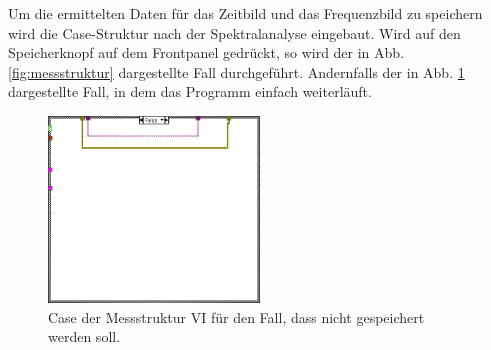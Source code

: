 Um die ermittelten Daten für das Zeitbild und das Frequenzbild zu speichern wird die Case-Struktur nach der Spektralanalyse eingebaut.
Wird auf den Speicherknopf auf dem Frontpanel gedrückt, so wird der in Abb. \ref{fig:messstruktur} dargestellte Fall durchgeführt.
Andernfalls der in Abb. \ref{fig:messstruktur_case} dargestellte Fall, in dem das Programm einfach weiterläuft.
\begin{figure}[H]
	\centering
	\includegraphics[width=0.5\textwidth]{pic/messstruktur_case.png}	
	\caption{Case der Messstruktur VI für den Fall, dass nicht gespeichert werden soll.}
	\label{fig:messstruktur_case}
\end{figure}

